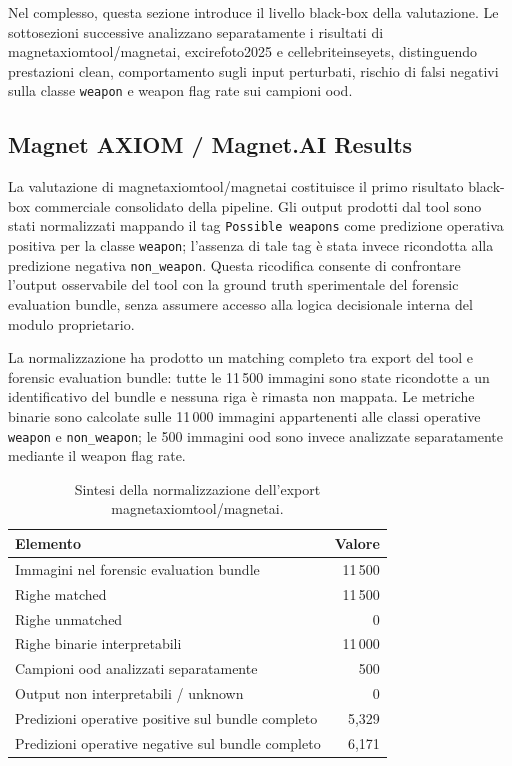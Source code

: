 Nel complesso, questa sezione introduce il livello black-box della valutazione.
Le sottosezioni successive analizzano separatamente i risultati di
\gls{magnetaxiomtool}/\gls{magnetai}, \gls{excirefoto2025} e
\gls{cellebriteinseyets}, distinguendo prestazioni clean, comportamento sugli
input perturbati, rischio di falsi negativi sulla classe \texttt{weapon} e weapon
flag rate sui campioni \gls{ood}.






\subsection{Magnet AXIOM / Magnet.AI Results}
\label{subsec:results-magnet}

La valutazione di \gls{magnetaxiomtool}/\gls{magnetai} costituisce il primo
risultato black-box commerciale consolidato della pipeline. Gli output prodotti
dal tool sono stati normalizzati mappando il tag \texttt{Possible weapons} come
predizione operativa positiva per la classe \texttt{weapon}; l'assenza di tale
tag è stata invece ricondotta alla predizione negativa
\texttt{non\_weapon}. Questa ricodifica consente di confrontare l'output
osservabile del tool con la ground truth sperimentale del forensic evaluation
bundle, senza assumere accesso alla logica decisionale interna del modulo
proprietario.

La normalizzazione ha prodotto un matching completo tra export del tool e
forensic evaluation bundle: tutte le 11\,500 immagini sono state ricondotte a un
identificativo del bundle e nessuna riga è rimasta non mappata. Le metriche
binarie sono calcolate sulle 11\,000 immagini appartenenti alle classi operative
\texttt{weapon} e \texttt{non\_weapon}; le 500 immagini \gls{ood} sono invece
analizzate separatamente mediante il weapon flag rate.

\begin{table}[H]
\centering
\caption{Sintesi della normalizzazione dell'export \gls{magnetaxiomtool}/\gls{magnetai}.}
\label{tab:results-magnet-normalization-summary}
\small
\begin{tabular}{lr}
\toprule
\textbf{Elemento} & \textbf{Valore} \\
\midrule
Immagini nel forensic evaluation bundle & 11\,500 \\
Righe matched & 11\,500 \\
Righe unmatched & 0 \\
Righe binarie interpretabili & 11\,000 \\
Campioni \gls{ood} analizzati separatamente & 500 \\
Output non interpretabili / unknown & 0 \\
Predizioni operative positive sul bundle completo & 5,329 \\
Predizioni operative negative sul bundle completo & 6,171 \\
\bottomrule
\end{tabular}
\end{table}

